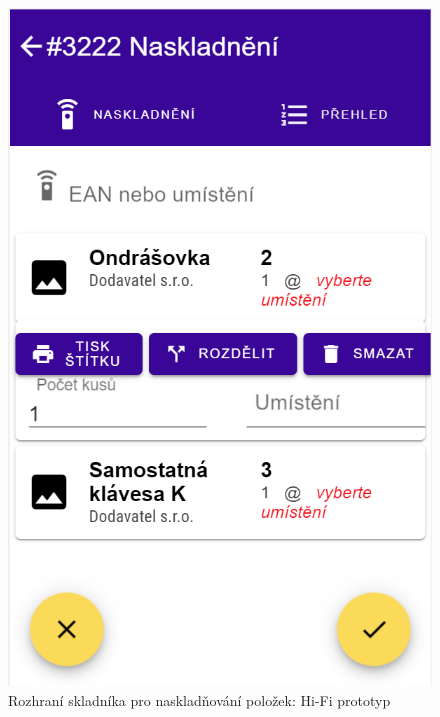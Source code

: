 \begin{figure}[]
\includegraphics[height=0.6\textheight]{../png/hifi/naskladneni.png}
\caption{Rozhraní skladníka pro naskladňování položek: Hi-Fi prototyp} \label{picture:hifi}
\end{figure}
